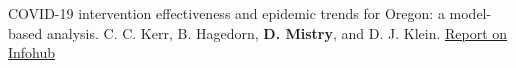 \begin{cventries}
  \cvpublicationentrytwo
    {COVID-19 intervention effectiveness and epidemic trends for Oregon: a model-based analysis.} %
    {C. C. Kerr, B. Hagedorn, \textbf{D. Mistry}, and D. J. Klein.} %
    {} %
    {} %
    {} %
    {} %
    {} %
    {\hspace{-6mm}} %
    {\href{https://covid.idmod.org/data/COVID-19_intervention_effectiveness_epidemic_trends_Oregon.pdf}{Report on Infohub \faLink\acvHeaderIconSep}
    } %
    \vspace{1.5mm}

\end{cventries}
